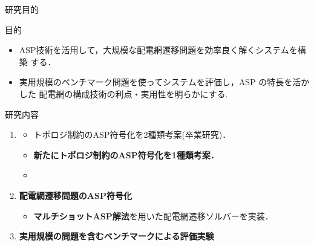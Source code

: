 \documentclass[dvipdfmx,11pt]{beamer}
\begin{document}
\begin{frame}{研究目的}
  \begin{alertblock}{目的}
\begin{itemize}
 \item ASP技術を活用して，大規模な配電網遷移問題を効率良く解くシステムを構築
       する．
 \item 実用規模のベンチマーク問題を使ってシステムを評価し，ASP の特長を活かした
       配電網の構成技術の利点・実用性を明らかにする.
\end{itemize}
  \end{alertblock}
  \vfill
 \begin{block}{研究内容}
  \begin{enumerate}
   \item {}
   \begin{itemize}
    \item トポロジ制約のASP符号化を2種類考案(卒業研究)．
    \item \alert{\bf 新たにトポロジ制約のASP符号化を1種類考案．}
    \item {}
   \end{itemize}
   \item \alert{\bf 配電網遷移問題のASP符号化}
   \begin{itemize}
    \item \textbf{マルチショットASP解法}を用いた配電網遷移ソルバーを実装．
   \end{itemize}
   \item \alert{\bf 実用規模の問題を含むベンチマークによる評価実験}
  \end{enumerate}
 \end{block}
\end{frame}
\end{document}
